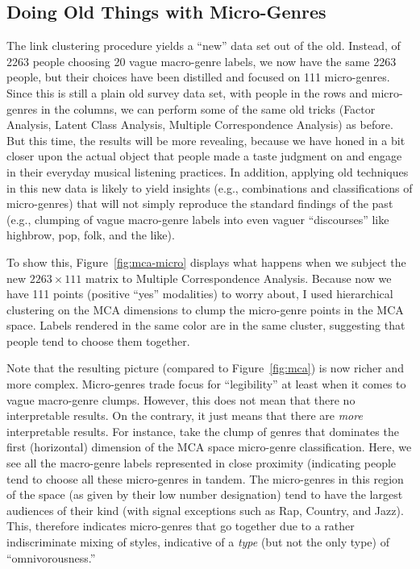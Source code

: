  \subsection{Doing Old Things with Micro-Genres}
 The link clustering procedure yields a ``new'' data set out of the old. Instead, of 2263 people choosing 20 vague macro-genre labels, we now have the same 2263 people, but their choices have been distilled and focused on 111 micro-genres. Since this is still a plain old survey data set, with people in the rows and micro-genres in the columns, we can perform some of the same old tricks (Factor Analysis, Latent Class Analysis, Multiple Correspondence Analysis) as before. But this time, the results will be more revealing, because we have honed in a bit closer upon the actual object that people made a taste judgment on and engage in their everyday musical listening practices. In addition, applying old techniques in this new data is likely to yield insights (e.g., combinations and classifications of micro-genres) that will not simply reproduce the standard findings of the past (e.g., clumping of vague macro-genre labels into even vaguer ``discourses'' like highbrow, pop, folk, and the like). 
 
 To show this, Figure~\ref{fig:mca-micro} displays what happens when we subject the new $2263 \times 111$ matrix to Multiple Correspondence Analysis. Because now we have 111 points (positive ``yes'' modalities) to worry about, I used hierarchical clustering on the MCA dimensions to clump the micro-genre points in the MCA space. Labels rendered in the same color are in the same cluster, suggesting that people tend to choose them together.  
 
 Note that the resulting picture (compared to Figure~\ref{fig:mca}) is now richer and more complex. Micro-genres trade focus for ``legibility'' at least when it comes to vague macro-genre clumps. However, this does not mean that there no interpretable results. On the contrary, it just means that there are \textit{more} interpretable results. For instance, take the clump of genres that dominates the first (horizontal) dimension of the MCA space micro-genre classification. Here, we see all the macro-genre labels represented in close proximity (indicating people tend to choose all these micro-genres in tandem. The micro-genres in this region of the space (as given by their low number designation) tend to have the largest audiences of their kind (with signal exceptions such as Rap, Country, and Jazz). This, therefore indicates micro-genres that go together due to a rather indiscriminate mixing of styles, indicative of a \textit{type} (but not the only type) of ``omnivorousness.'' 
 
